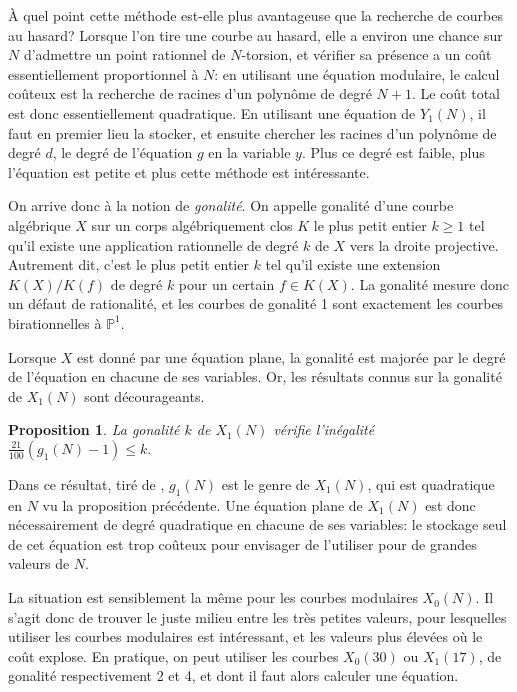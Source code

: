 \documentclass[11pt,a4paper]{article}
\renewcommand{\P}{\mathbb{P}}
\newtheorem*{prop}{Proposition}
\theoremstyle{definition}
\begin{document}
À quel point cette méthode est-elle plus avantageuse que la recherche de courbes au hasard? Lorsque l'on tire une courbe au hasard, elle a environ une chance sur $N$ d'admettre un point rationnel de $N$-torsion, et vérifier sa présence a un coût essentiellement proportionnel à $N$: en utilisant une équation modulaire, le calcul coûteux est la recherche de racines d'un polynôme de degré $N + 1$. Le coût total est donc essentiellement quadratique. En utilisant une équation de $Y_1(N)$, il faut en premier lieu la stocker, et ensuite chercher les racines d'un polynôme de degré $d$, le degré de l'équation $g$ en la variable $y$. Plus ce degré est faible, plus l'équation est petite et plus cette méthode est intéressante.

On arrive donc à la notion de \emph{gonalité}. On appelle gonalité d'une courbe algébrique $X$ sur un corps algébriquement clos $K$ le plus petit entier $k\geq 1$ tel qu'il existe une application rationnelle de degré $k$ de $X$ vers la droite projective. Autrement dit, c'est le plus petit entier $k$ tel qu'il existe une extension $K(X)/K(f)$ de degré $k$ pour un certain $f\in K(X)$. La gonalité mesure donc un défaut de rationalité, et les courbes de gonalité 1 sont exactement les courbes birationnelles à $\P^1$.

Lorsque $X$ est donné par une équation plane, la gonalité est majorée par le degré de l'équation en chacune de ses variables. Or, les résultats connus sur la gonalité de $X_1(N)$ sont décourageants.

\begin{prop}
La gonalité $k$ de $X_1(N)$ vérifie l'inégalité $\frac{21}{100}(g_1(N)-1)\leq k.$
\end{prop}

Dans ce résultat, tiré de \cite{gon}, $g_1(N)$ est le genre de $X_1(N)$, qui est quadratique en $N$ vu la proposition précédente. Une équation plane de $X_1(N)$ est donc nécessairement de degré quadratique en chacune de ses variables: le stockage seul de cet équation est trop coûteux pour envisager de l'utiliser pour de grandes valeurs de $N$.

La situation est sensiblement la même pour les courbes modulaires $X_0(N)$. Il s'agit donc de trouver le juste milieu entre les très petites valeurs, pour lesquelles utiliser les courbes modulaires est intéressant, et les valeurs plus élevées où le coût explose. En pratique, on peut utiliser les courbes $X_0(30)$ ou $X_1(17)$, de gonalité respectivement 2 et 4, et dont il faut alors calculer une équation.
\end{document}
